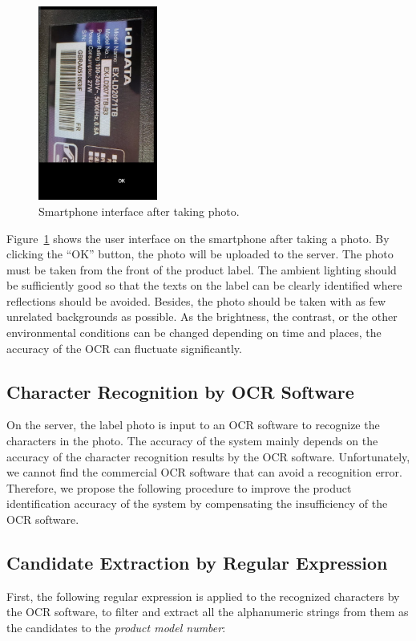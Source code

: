 \documentclass[technicalreport]{ieicej}
\begin{document}
        \begin{figure}[t] 
            \begin{center}
            \includegraphics[width=0.35\textwidth]{figure/camera.png}
            \end{center}
            \caption{Smartphone interface after taking photo.}
            \label{fig:camera}
        \end{figure}

        Figure~\ref{fig:camera} shows the user interface on the smartphone after taking a photo. By clicking the “OK” button, the photo will be uploaded to the server. The photo must be taken from the front of the product label. The ambient lighting should be sufficiently good so that the texts on the label can be clearly identified where reflections should be avoided. Besides, the photo should be taken with as few unrelated backgrounds as possible. As the brightness, the contrast, or the other environmental conditions can be changed depending on time and places, the accuracy of the OCR can fluctuate significantly. 

    \subsection{Character Recognition by OCR Software}
        On the server, the label photo is input to an OCR software to recognize the characters in the photo. The accuracy of the system mainly depends on the accuracy of the character recognition results by the OCR software. Unfortunately, we cannot find the commercial OCR software that can avoid a recognition error. Therefore, we propose the following procedure to improve the product identification accuracy of the system by compensating the insufficiency of the OCR software.

    \subsection{Candidate Extraction by Regular Expression}
    \label{sec:regex}
        First, the following regular expression is applied to the recognized characters by the OCR software, to filter and extract all the alphanumeric strings from them as the candidates to the {\em product model number}:
\end{document}
